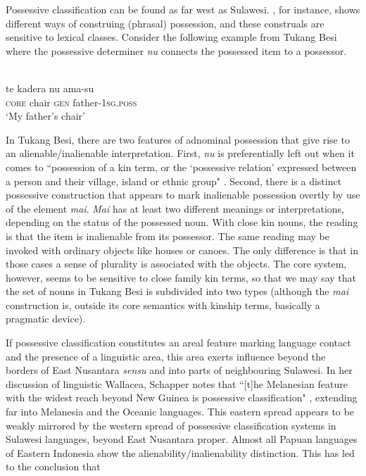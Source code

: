 Possessive classification can be found as far west as Sulawesi. , for instance, shows different ways of construing (phrasal) possession, and these construals are sensitive to lexical classes. Consider the following example from Tukang Besi where the possessive determiner \textit{nu} connects the possessed item to a possessor.

\ea 
{}\\
\gll te kadera nu ama-su\\
\textsc{core} chair \textsc{gen} father-\textsc{1}\textsc{sg}.\textsc{poss}\\
\glt ‘My father's chair’
\z

In Tukang Besi, there are two features of adnominal possession that give rise to an alienable/inalienable interpretation. First, \textit{nu} is preferentially left out when it comes to ``possession of a kin term, or the `possessive relation' expressed between a person and their village, island or ethnic group" \citep[346]{donohue1999}. Second, there is a distinct possessive construction that appears to mark inalienable possession overtly by use of the element \textit{mai}. \textit{Mai} has at least two different meanings or interpretations, depending on the status of the possessed noun. With close kin nouns, the reading is that the item is inalienable from its possessor. The same reading may be invoked with ordinary objects like houses or canoes. The only difference is that in those cases a sense of plurality is associated with the objects. The core system, however, seems to be sensitive to close family kin terms, so that we may say that the set of nouns in Tukang Besi is subdivided into two types (although the \textit{mai} construction is, outside its core semantics with kinship terms, basically a pragmatic device). 

If possessive classification constitutes an areal feature marking language contact and the presence of a linguistic area, this area exerts influence beyond the borders of East Nusantara \textit{sensu} \citet{klamer2008east} and into parts of neighbouring Sulawesi. In her discussion of linguistic Wallacea, Schapper notes that ``[t]he Melanesian feature with the widest reach beyond New Guinea is possessive classification" \citep[108]{schapper2015wallacea}, extending far into Melanesia and the Oceanic languages. This eastern spread appears to be weakly mirrored by the western spread of possessive classification systems in Sulawesi languages, beyond East Nusantara proper. Almost all Papuan languages of Eastern Indonesia show the alienability/inalienability distinction. This has led \citet[120]{klamer2008east} to the conclusion that

